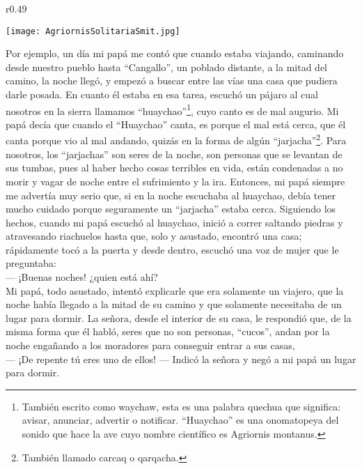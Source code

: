 \ifdefined\EnableIncludeImages
\begin{wrapfigure}{r}{0.49\textwidth}
  \begin{center}
  \vspace{-20pt}
    \texttt{[image: AgriornisSolitariaSmit.jpg]}
  \end{center}
  \vspace{-20pt}
\end{wrapfigure}
\fi
Por ejemplo, un día mi papá me contó que cuando estaba viajando, caminando desde nuestro pueblo hasta ``Cangallo'', un poblado distante, a la mitad del camino, la noche llegó, y empezó a buscar entre las vías una casa que pudiera darle posada. En cuanto él estaba en esa tarea, escuchó un pájaro al cual nosotros en la sierra llamamos ``huaychao''\footnote{También escrito como waychaw, esta es una palabra quechua que significa: avisar, anunciar, advertir o notificar. ``Huaychao'' es una onomatopeya del sonido que hace la ave cuyo nombre científico es Agriornis montanus.}, cuyo canto es de mal augurio.
Mi papá decía que cuando el ``Huaychao'' canta, es porque el mal está cerca, que él canta porque vio al mal andando, quizás en la forma de algún ``jarjacha''\footnote{También llamado carcaq o qarqacha.}. 
Para nosotros, los ``jarjachas'' son seres de la noche, son personas que se levantan de sus tumbas, pues al haber hecho cosas terribles en vida, están condenadas a no morir y vagar de noche entre el sufrimiento y la ira.
Entonces, mi papá siempre me advertía muy serio que, si en la noche escuchaba al huaychao, debía tener mucho cuidado porque seguramente un ``jarjacha'' estaba cerca.
Siguiendo los hechos, cuando mi papá escuchó al huaychao, inició a correr saltando piedras y atravesando riachuelos hasta que, solo y asustado, encontró una casa; rápidamente tocó a la puerta y desde dentro, escuchó una voz de mujer que le preguntaba:\\\indent
--- ¡Buenas noches! ¿quien está ahí?\\\indent
Mi papá, todo asustado, intentó explicarle que era solamente un viajero, que la noche había llegado a la mitad de su camino y que solamente necesitaba de un lugar para dormir. La señora, desde el interior de su casa, le respondió que, de la misma forma que él habló, seres que no son personas, ``cucos'', andan por la noche engañando a los moradores para conseguir entrar a sus casas,\\\indent
--- ¡De repente tú eres uno de ellos! --- Indicó la señora y negó a mi papá un lugar para dormir. \\\indent
